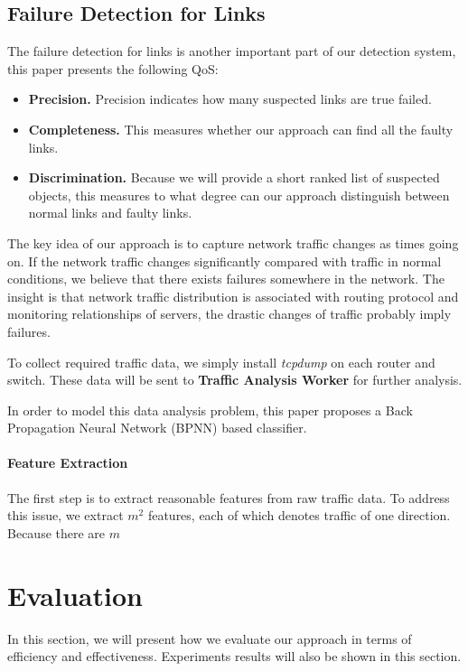 \documentclass{sig-alternate-05-2015}
\begin{document}
\subsection{Failure Detection for Links}
The failure detection for links is another important part of our detection system, this paper presents the following QoS:
\begin{itemize}
  \item \textbf{Precision.} Precision indicates how many suspected links are true failed. 
  \item \textbf{Completeness.} This measures whether our approach can find all the faulty links.
  \item \textbf{Discrimination.} Because we will provide a short ranked list of suspected objects, this measures to what degree can our approach distinguish between normal links and faulty links.
\end{itemize}

The key idea of our approach is to capture network traffic changes as times going on. If the network traffic changes significantly compared with traffic in normal conditions, we believe that there exists failures somewhere in the network. The insight is that network traffic distribution is associated with routing protocol and monitoring relationships of servers, the drastic changes of traffic probably imply failures.

To collect required traffic data, we simply install \textit{tcpdump} on each router and switch. These data will be sent to \textbf{Traffic Analysis Worker} for further analysis.

In order to model this data analysis problem, this paper proposes a Back Propagation Neural Network (BPNN) based classifier. 

\paragraph{Feature Extraction}
The first step is to extract reasonable features from raw traffic data. To address this issue, we extract $m^2$ features, each of which denotes traffic of one direction. Because there are $m$

\section{Evaluation}
In this section, we will present how we evaluate our approach in terms of efficiency and effectiveness. Experiments results will also be shown in this section.
\end{document}
